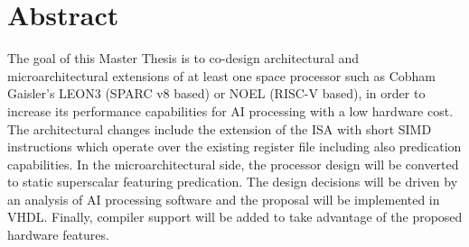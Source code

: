 \section*{Abstract}
\thispagestyle{nonum}

The goal of this Master Thesis is to co-design architectural and
microarchitectural extensions of at least one space processor such as Cobham
Gaisler's LEON3 (SPARC v8 based) or NOEL (RISC-V based), in order to increase
its performance capabilities for AI processing with a low hardware cost. The
architectural changes include the extension of the ISA with short SIMD
instructions which operate over the existing register file including also
predication capabilities. In the microarchitectural side, the processor design
will be converted to static superscalar featuring predication. The design
decisions will be driven by an analysis of AI processing software and the
proposal will be implemented in VHDL. Finally, compiler support will be added to
take advantage of the proposed hardware features.
